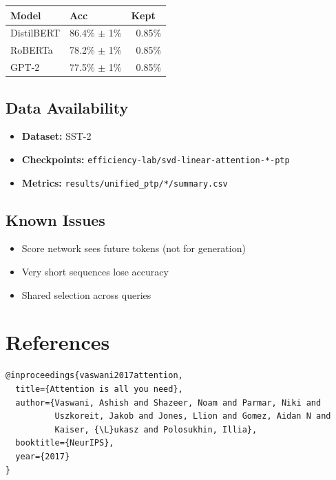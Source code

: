 {\begin{table}[H]
\centering
\small
\begin{tabular}{lll}
\toprule
\textbf{Model} & \textbf{Acc} & \textbf{Kept} \\
\midrule
DistilBERT & 86.4\% $\pm$ 1\% & ~0.85\% \\
RoBERTa & 78.2\% $\pm$ 1\% & ~0.85\% \\
GPT-2 & 77.5\% $\pm$ 1\% & ~0.85\% \\
\bottomrule
\end{tabular}
\end{table}

\subsection{Data Availability}

\begin{itemize}
\item \textbf{Dataset:} SST-2
\item \textbf{Checkpoints:} \texttt{efficiency-lab/svd-linear-attention-*-ptp}
\item \textbf{Metrics:} \texttt{results/unified\_ptp/*/summary.csv}

\end{itemize}
\subsection{Known Issues}

\begin{itemize}
\item Score network sees future tokens (not for generation)
\item Very short sequences lose accuracy
\item Shared selection across queries

\end{itemize}



\section{References}

\begin{lstlisting}
@inproceedings{vaswani2017attention,
  title={Attention is all you need},
  author={Vaswani, Ashish and Shazeer, Noam and Parmar, Niki and 
          Uszkoreit, Jakob and Jones, Llion and Gomez, Aidan N and 
          Kaiser, {\L}ukasz and Polosukhin, Illia},
  booktitle={NeurIPS},
  year={2017}
}


\end{lstlisting}}
